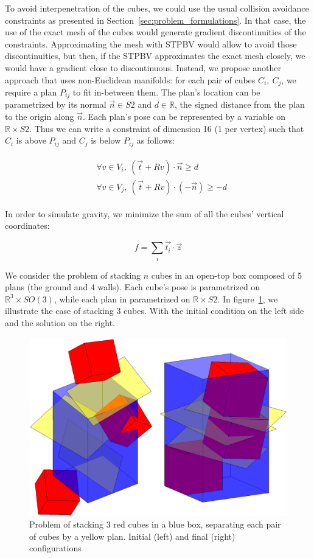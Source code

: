 To avoid interpenetration of the cubes, we could use the usual collision avoidance constraints as presented in Section~\ref{sec:problem_formulations}.
In that case, the use of the exact mesh of the cubes would generate gradient discontinuities of the constraints.
Approximating the mesh with STPBV would allow to avoid those discontinuities, but then, if the STPBV approximates the exact mesh closely, we would have a gradient close to discontinuous.
Instead, we propose another approach that uses non-Euclidean manifolds: for each pair of cubes $C_i,\ C_j$, we require a plan $P_{ij}$ to fit in-between them.
The plan's location can be parametrized by its normal $\vec{n}\in S2$ and $d\in\mathbb{R}$, the signed distance from the plan to the origin along $\vec{n}$.
Each plan's pose can be represented by a variable on $\mathbb{R} \times S2$.
Thus we can write a constraint of dimension 16 (1 per vertex) such that $C_i$ is above $P_{ij}$ and $C_j$ is below $P_{ij}$ as follows:

\begin{align}
  \begin{split}
    &\forall v\in V_i,\ (\vec{t} + R v)\cdot \vec{n} \geq d \\
    &\forall v\in V_j,\ (\vec{t} + R v)\cdot \left(-\vec{n}\right) \geq -d
  \end{split}
\end{align}

In order to simulate gravity, we minimize the sum of all the cubes' vertical coordinates:

\begin{equation}
  f = \sum\limits_i \vec{t_i}\cdot \vec{z}
\end{equation}

We consider the problem of stacking $n$ cubes in an open-top box composed of 5 plans (the ground and 4 walls).
Each cube's pose is parametrized on $\mathbb{R}^3\times SO(3)$, while each plan in parametrized on $\mathbb{R}\times S2$.
In figure~\ref{fig:cubes}, we illustrate the case of stacking 3 cubes.
With the initial condition on the left side and the solution on the right.
\begin{figure}
\centering
  \includegraphics[width=.8\linewidth]{3cubes.png}
  \caption{Problem of stacking 3 red cubes in a blue box, separating each pair of cubes by a yellow plan. Initial (left) and final (right) configurations}
\label{fig:cubes}
\end{figure}

